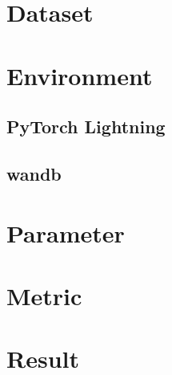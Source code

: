 \hspace{24pt}



\section{Dataset} \label{sec:dataset}


\section{Environment} \label{sec:environment}


\subsection{PyTorch Lightning} \label{sec:lightning}


\subsection{wandb} \label{sec:wandb}


\section{Parameter} \label{sec:parameter}


\section{Metric} \label{sec:metric}


\section{Result} \label{sec:result}



